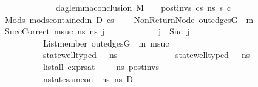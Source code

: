\begin{isabellebody}
\ \ \ \ \ \ \ \ \ \ \ \ \ \ \ dag{\isacharunderscore}{\kern0pt}lemma{\isacharunderscore}{\kern0pt}conclusion\ M\ {\isasymLambda}\ {\isasymGamma}\ {\isasymOmega}\ post{\isacharunderscore}{\kern0pt}invs\ cs{}\ ns{}\ s{}{\isacharprime}{\kern0pt}{\isacharprime}{\kern0pt}\ c{\isachardoublequoteclose}\ \isanewline
\ \ \ Mods{\isacharcolon}{\kern0pt}\ {\isachardoublequoteopen}mods{\isacharunderscore}{\kern0pt}contained{\isacharunderscore}{\kern0pt}in\ D\ cs{}{\isachardoublequoteclose}\ \isanewline
\ \ \ NonReturnNode{\isacharcolon}{\kern0pt}\ {\isachardoublequoteopen}out{\isacharunderscore}{\kern0pt}edges{\isacharparenleft}{\kern0pt}G{}{\isacharparenright}{\kern0pt}\ {\isacharbang}{\kern0pt}\ m{}\ {\isasymnoteq}\ {\isacharbrackleft}{\kern0pt}{\isacharbrackright}{\kern0pt}{\isachardoublequoteclose}\ \isanewline
\ \ \ SuccCorrect{\isacharcolon}{\kern0pt}{\isachardoublequoteopen}{\isasymAnd}\ msuc\ ns{}{\isacharprime}{\kern0pt}{\isacharprime}{\kern0pt}\ ns{}{\isacharprime}{\kern0pt}{\isacharprime}{\kern0pt}\ j{\isacharprime}{\kern0pt}{\isachardot}{\kern0pt}\isanewline
\ \ \ \ \ \ \ \ \ \ \ \ j\ {\isacharequal}{\kern0pt}\ Suc\ j{\isacharprime}{\kern0pt}\ {\isasymLongrightarrow}\isanewline
\ \ \ \ \ \ \ \ \ \ \ \ List{\isachardot}{\kern0pt}member\ {\isacharparenleft}{\kern0pt}out{\isacharunderscore}{\kern0pt}edges{\isacharparenleft}{\kern0pt}G{}{\isacharparenright}{\kern0pt}\ {\isacharbang}{\kern0pt}\ m{}{\isacharparenright}{\kern0pt}\ msuc\ {\isasymLongrightarrow}\isanewline
\ \ \ \ \ \ \ \ \ \ \ \ state{\isacharunderscore}{\kern0pt}well{\isacharunderscore}{\kern0pt}typed\ {\isasymLambda}\ {\isasymOmega}\ ns{}{\isacharprime}{\kern0pt}{\isacharprime}{\kern0pt}\ {\isasymLongrightarrow}\isanewline
\ \ \ \ \ \ \ \ \ \ \ \ state{\isacharunderscore}{\kern0pt}well{\isacharunderscore}{\kern0pt}typed\ {\isasymLambda}\ {\isasymOmega}\ ns{}{\isacharprime}{\kern0pt}{\isacharprime}{\kern0pt}\ {\isasymLongrightarrow}\isanewline
\ \ \ \ \ \ \ \ \ \ \ \ list{\isacharunderscore}{\kern0pt}all\ {\isacharparenleft}{\kern0pt}expr{\isacharunderscore}{\kern0pt}sat\ {\isasymLambda}\ {\isasymGamma}\ {\isasymOmega}\ \ ns{}{\isacharprime}{\kern0pt}{\isacharprime}{\kern0pt}{\isacharparenright}{\kern0pt}\ post{\isacharunderscore}{\kern0pt}invs\ {\isasymLongrightarrow}\isanewline
\ \ \ \ \ \ \ \ \ \ \ \ nstate{\isacharunderscore}{\kern0pt}same{\isacharunderscore}{\kern0pt}on\ {\isasymLambda}\ ns{}\ ns{}{\isacharprime}{\kern0pt}{\isacharprime}{\kern0pt}\ D\ {\isasymLongrightarrow}\isanewline

\end{isabellebody}
